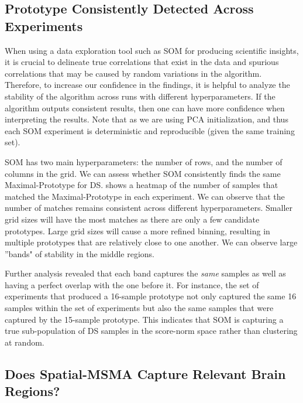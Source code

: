\subsection*{Prototype Consistently Detected Across Experiments}

When using a data exploration tool such as SOM for producing scientific insights, it is crucial to delineate true correlations that exist in the data and spurious correlations that may be caused by random variations in the algorithm. Therefore, to increase our confidence in the findings, it is helpful to analyze the stability of the algorithm across runs with different hyperparameters. If the algorithm outputs consistent results, then one can have more confidence when interpreting the results. Note that as we are using PCA initialization, and thus each SOM experiment is deterministic and reproducible (given the same training set).

SOM has two main hyperparameters: the number of rows, and the number of columns in the grid. We can assess whether SOM consistently finds the same Maximal-Prototype for DS. 
 shows a heatmap of the number of samples that matched the Maximal-Prototype in each experiment. We can observe that the number of matches remains consistent across different hyperparameters. Smaller grid sizes will have the most matches as there are only a few candidate prototypes. Large grid sizes will cause a more refined binning, resulting in multiple prototypes that are relatively close to one another. We can observe large ''bands" of stability in the middle regions.

Further analysis revealed that each band captures the \textit{same} samples as well as having a perfect overlap with the one before it. For instance, the set of experiments that produced a 16-sample prototype not only captured the same 16 samples within the set of experiments but also the same samples that were captured by the 15-sample prototype. This indicates that SOM is capturing a true sub-population of DS samples in the score-norm space rather than clustering at random.




\subsection*{Does Spatial-MSMA Capture Relevant Brain Regions?}

